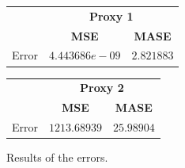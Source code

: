 \begin{figure}[!h]
\centering
\begin{minipage}{\textwidth}
\begin{minipage}{0.5\textwidth}
\begin{center}
\vskip10pt
   \begin{footnotesize}
   \begin{tabular}{|c|c|c|}
   \hline
   & \multicolumn{2}{|c|}{\textbf{Proxy 1}} \\ \cline{2-3}
   & \textbf{MSE} & \textbf{MASE}          \\ \hline
   Error & $4.443686e-09$ & $2.821883$     \\ 
   \hline
   \end{tabular}
   \end{footnotesize}
\end{center}
\end{minipage}
\begin{minipage}{0.5\textwidth}
\begin{center}
\vskip12pt
   \begin{footnotesize}
   \begin{tabular}{|c|c|c|}
   \hline
   & \multicolumn{2}{|c|}{\textbf{Proxy 2}} \\ \cline{2-3}
   & \textbf{MSE} & \textbf{MASE}          \\ \hline
   Error & $1213.68939$      & $25.98904$     \\ 
   \hline
   \end{tabular}
   \end{footnotesize}
\end{center}
\end{minipage}
\end{minipage}
\caption{Results of the errors.}
\label{fig:table10yNaive}
\end{figure}
